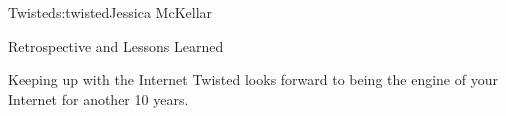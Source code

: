 \begin{aosachapter}{Twisted}{s:twisted}{Jessica McKellar}
\begin{aosasect1}{Retrospective and Lessons Learned}
\begin{aosasect2}{Keeping up with the Internet}
Twisted looks forward to being the engine of your Internet for another 10
years.

\end{aosasect2}

\end{aosasect1}

\end{aosachapter}
